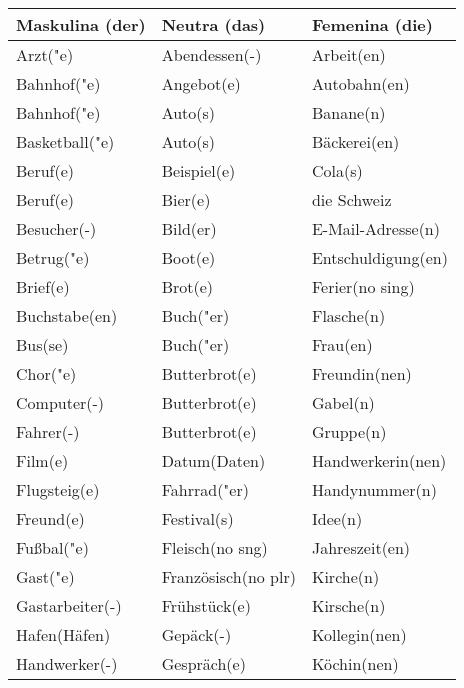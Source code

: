 \documentclass{article}
\renewcommand{\arraystretch}{1}
\begin{document}
\begin{table}[h!]
    \centering
    \label{tab:tabla1}
    \renewcommand{\arraystretch}{1.5}
    \begin{tabular}{|>{\raggedright\arraybackslash}p{5cm}|>{\raggedright\arraybackslash}p{5cm}|>{\raggedright\arraybackslash}p{5cm}|}
        \hline
        \rowcolor{gray!20} \textbf{Maskulina (der)} & \textbf{Neutra (das)} & \textbf{Femenina (die)} \\
        \hline
        Arzt("e) & Abendessen(-) & Arbeit(en) \\\hline
        Bahnhof("e) & Angebot(e) & Autobahn(en) \\\hline
        Bahnhof("e) & Auto(s) & Banane(n) \\\hline
        Basketball("e) & Auto(s) & Bäckerei(en) \\\hline
        Beruf(e) & Beispiel(e) & Cola(s) \\\hline
        Beruf(e) & Bier(e) & die Schweiz \\\hline
        Besucher(-) & Bild(er) & E-Mail-Adresse(n) \\\hline
        Betrug("e) & Boot(e) & Entschuldigung(en) \\\hline
        Brief(e) & Brot(e) & Ferier(no sing) \\\hline
        Buchstabe(en) & Buch("er) & Flasche(n) \\\hline
        Bus(se) & Buch("er) & Frau(en) \\\hline
        Chor("e) & Butterbrot(e) & Freundin(nen) \\\hline
        Computer(-) & Butterbrot(e) & Gabel(n) \\\hline
        Fahrer(-) & Butterbrot(e) & Gruppe(n) \\\hline
        Film(e) & Datum(Daten) & Handwerkerin(nen) \\\hline
        Flugsteig(e) & Fahrrad("er) & Handynummer(n) \\\hline
        Freund(e) & Festival(s) & Idee(n) \\\hline
        Fu\ss{}bal("e) & Fleisch(no sng) & Jahreszeit(en) \\\hline
        Gast("e) & Französisch(no plr) & Kirche(n) \\\hline
        Gastarbeiter(-) & Frühstück(e) & Kirsche(n) \\\hline
        Hafen(Häfen) & Gepäck(-) & Kollegin(nen) \\\hline
        Handwerker(-) & Gespräch(e) & Köchin(nen) \\\hline

\end{tabular}
\end{table}
\end{document}
